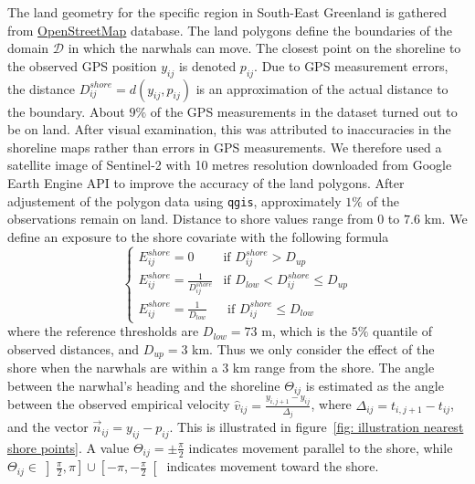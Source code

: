 \documentclass[11pt]{article}
\newcommand {\1}{\mathbb{1}}
\theoremstyle{definition}
\theoremstyle{remark}
\theoremstyle{remark}
\begin{document}
The land geometry for the specific region in South-East Greenland is gathered from \href{https://www.openstreetmap.org/#map=11/70.4029/-27.2928}{OpenStreetMap} database. The land polygons define the boundaries of the domain $\mathcal{D}$ in which the narwhals can move. The closest point on the shoreline to the observed GPS position $y_{ij}$  is denoted $p_{ij}$. Due to GPS measurement errors, the distance $D^{shore}_{ij}=d(y_{ij},p_{ij})$ is an approximation of the actual distance to the boundary. About $9\%$ of the GPS measurements in the dataset turned out to be on land. After visual examination, this was attributed to inaccuracies in the shoreline maps rather than errors in GPS measurements. We therefore used a satellite image of Sentinel-2 with 10 metres resolution downloaded from Google Earth Engine API to improve the accuracy of the land polygons. After adjustement of the polygon data using \texttt{qgis},  approximately $1 \%$ of the observations remain on land. Distance to shore values range from $0$ to $7.6$ km. We define an exposure to the shore covariate with the following formula
\begin{equation}
	\left\{
	\begin{array}{ll}
		E^{shore}_{ij}=0 & \mbox{if } D^{shore}_{ij}>D_{up} \\
		E^{shore}_{ij}=\frac{1}{D^{shore}_{ij}} & \mbox{if } D_{low}<D^{shore}_{ij} \leq D_{up} \\
		E^{shore}_{ij}=\frac{1}{D_{low}} & \mbox{ if } D^{shore}_{ij} \leq D_{low}
	\end{array}
	\right.
	\label{eq: exp shore definition}
\end{equation}
where the reference thresholds are $D_{low}=73$ m, which is the $5\%$ quantile of observed distances, and $D_{up}=3$ km. Thus we only consider the effect of the shore when the narwhals are within a $3$ km range from the shore. 
The angle between the narwhal's heading and the shoreline $\Theta_{ij}$ is estimated as the angle between the observed empirical velocity $\hat{v}_{ij}=\frac{y_{i,j+1}-y_{ij}}{\Delta_j}$, where $\Delta_{ij}=t_{i,j+1}-t_{ij}$, and the vector $\vec{n}_{ij}=y_{ij}-p_{ij}$. This is illustrated in figure~\ref{fig: illustration nearest shore points}. A value $\Theta_{ij}=\pm \frac{\pi}{2}$ indicates movement parallel to the shore, while $\Theta_{ij} \in \left]\frac{\pi}{2},\pi\right] \cup \left[-\pi,-\frac{\pi}{2}\right[$ indicates movement toward the shore. 
\end{document}
